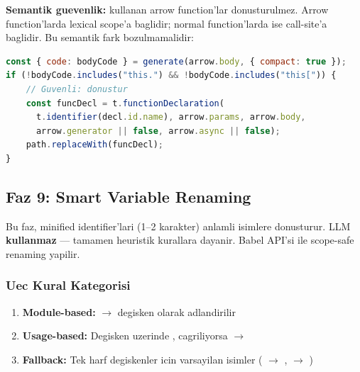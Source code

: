 \textbf{Semantik guevenlik:}  kullanan arrow function'lar donusturulmez. Arrow function'larda  lexical scope'a baglidir; normal function'larda ise call-site'a baglidir. Bu semantik fark bozulmamalidir:

\begin{lstlisting}[language=JavaScript, caption={Arrow-to-function this kontrolu}]
const { code: bodyCode } = generate(arrow.body, { compact: true });
if (!bodyCode.includes("this.") && !bodyCode.includes("this[")) {
    // Guvenli: donustur
    const funcDecl = t.functionDeclaration(
      t.identifier(decl.id.name), arrow.params, arrow.body,
      arrow.generator || false, arrow.async || false);
    path.replaceWith(funcDecl);
}
\end{lstlisting}


\subsection{Faz 9: Smart Variable Renaming}
\label{sec:phase9-rename}

Bu faz, minified identifier'lari (1--2 karakter) anlamli isimlere donusturur. LLM \textbf{kullanmaz} --- tamamen heuristik kurallara dayanir. Babel  API'si ile scope-safe renaming yapilir.

\subsubsection{Uec Kural Kategorisi}

\begin{enumerate}
\item \textbf{Module-based:}  $\to$ degisken  olarak adlandirilir
\item \textbf{Usage-based:} Degisken uzerinde ,  cagriliyorsa $\to$ 
\item \textbf{Fallback:} Tek harf degiskenler icin varsayilan isimler ( $\to$ ,  $\to$ )
\end{enumerate}

